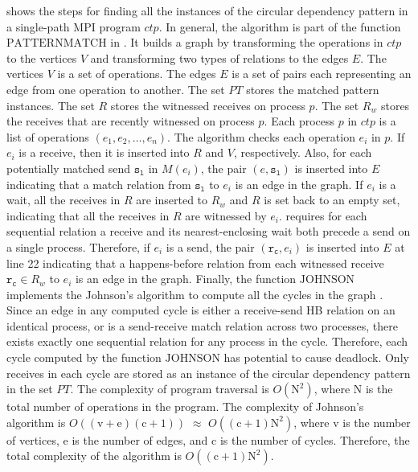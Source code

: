  shows the steps for finding all the instances of the circular dependency pattern in a single-path MPI program $\mathit{ctp}$. In general, the algorithm is part of the function $\mathrm{PATTERNMATCH}$ in . It builds a graph by transforming the operations in $\mathit{ctp}$ to the vertices $\mathit{V}$ and transforming two types of relations to the edges $\mathit{E}$. 
The vertices $\mathit{V}$ is a set of operations. The edges $\mathit{E}$ is a set of pairs each representing an edge from one operation to another. 
The set $\mathit{PT}$ stores the matched pattern instances.
The set $\mathit{R}$ stores the witnessed receives on process $p$. 
The set $\mathit{R_w}$ stores the receives that are recently witnessed on process $p$.
Each process $p$ in $\mathit{ctp}$ is a list of operations $(e_1, e_2, \dots, e_n)$. 
The algorithm checks each operation $e_i$ in $p$. 
If $\mathit{e_i}$ is a receive, then it is inserted into $\mathit{R}$ and $\mathit{V}$, respectively. Also, for each potentially matched send $\mathtt{s_l}$ in $\mathit{M}(\mathit{e_i})$, the pair $(\mathit{e},\mathtt{s_l})$ is inserted into $\mathit{E}$ indicating that a match relation from $\mathtt{s_l}$ to $\mathit{e_i}$ is an edge in the graph. If $\mathit{e_i}$ is a wait, all the receives in $\mathit{R}$ are inserted to $\mathit{R_w}$ and $\mathit{R}$ is set back to an empty set, indicating that all the receives in $\mathit{R}$ are witnessed by $\mathit{e_i}$.  requires for each sequential relation a receive and its nearest-enclosing wait both precede a send on a single process. Therefore, %
if $\mathit{e_i}$ is a send, the pair $(\mathtt{r_c},\mathit{e_i})$ is inserted into $\mathit{E}$ at line 22 indicating that a happens-before relation from each witnessed receive $\mathtt{r_c}\in\mathit{R_w}$ to $\mathit{e_i}$ is an edge in the graph. Finally, the function $\mathrm{JOHNSON}$ implements the Johnson's algorithm to compute all the cycles in the graph \cite{DBLP:journals/siamcomp/Johnson75}. Since an edge in any computed cycle is either a receive-send HB relation on an identical process, or is a send-receive match relation across two processes, there exists exactly one sequential relation for any process in the cycle. Therefore, each cycle computed by the function $\mathrm{JOHNSON}$ has potential to cause deadlock. Only receives in each cycle are stored as an instance of the circular dependency pattern in the set $\mathit{PT}$. The complexity of program traversal is $O(\mathrm{N}^2)$, where $\mathrm{N}$ is the total number of operations in the program. The complexity of Johnson's algorithm is $O((\mathrm{v}+\mathrm{e})(\mathrm{c}+1))$ $\approx$ $O((\mathrm{c}+1)\mathrm{N}^2)$, where $\mathrm{v}$ is the number of vertices, $\mathrm{e}$ is the number of edges, and $\mathrm{c}$ is the number of cycles. Therefore, the total complexity of the algorithm is $O((\mathrm{c}+1)\mathrm{N}^2)$.

